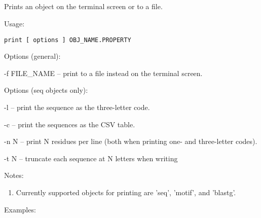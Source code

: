 


\subsection[print]{  }



Prints an object on the terminal screen or to a file.


\begin{description}


\item{Usage:}

{\tt print [ options ] OBJ\_NAME.PROPERTY}


\item{Options (general):}
\begin{description}
\item -f FILE\_NAME -- print to a file instead on the terminal screen.
\end{description}

\item{Options (seq objects only):}
\begin{description}
\item -l -- print the sequence as the three-letter code.
\item -c -- print the sequences as the CSV table.
\item -n N -- print N residues per line (both when printing one- and
 three-letter codes).
\item -t N -- truncate each sequence at N letters when writing
\end{description}


\item{Notes:}
\begin{enumerate}
\item Currently supported objects for printing are 'seq', 'motif',
and 'blastg'. 
\end{enumerate}


\item{Examples:}
\begin{enumerate}


\end{enumerate}
\end{description}
